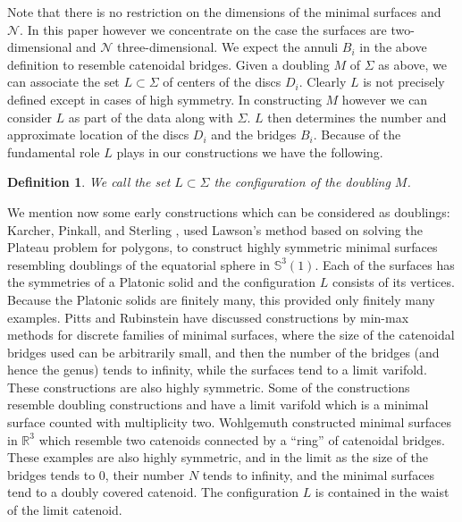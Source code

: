 \documentclass[12pt,namelimits,sumlimits]{amsart}
\newtheorem{definition}[theorem]{Definition}
\theoremstyle{remark}
\numberwithin{equation}{section}
\begin{document}
Note that there is no restriction on the dimensions of the minimal surfaces and ${{\mathcal{N}}}$.
In this paper however we concentrate on the case the surfaces are two-dimensional and ${{\mathcal{N}}}$
three-dimensional.
We expect the annuli $B_i$ in the above definition to resemble catenoidal bridges.
Given a doubling $M$ of $\Sigma$ as above, we can associate the set $L\subset\Sigma$ of centers of the discs
$D_i$.
Clearly $L$ is not precisely defined except in cases of high symmetry.
In constructing $M$ however we can consider $L$ as part of the data along with $\Sigma$.
$L$ then determines the number and approximate location of the discs $D_i$ and the bridges $B_i$.
Because of the fundamental role $L$ plays in our constructions we have the following.

\addtocounter{equation}{1}
\begin{definition}
\label{Dconfig}
We call the set $L\subset\Sigma$ the configuration of the doubling $M$.
\end{definition}

We mention now some
early constructions which can be considered as doublings:
Karcher, Pinkall, and Sterling \cite{KPS},
used Lawson's method \cite{L2} based on solving the Plateau problem for polygons,
to construct highly symmetric minimal surfaces
resembling doublings of the equatorial sphere in ${\mathbb{S}}^3(1)$.
Each of the surfaces has the symmetries of a Platonic solid
and the configuration $L$ consists of its vertices.
Because the Platonic solids are finitely many,
this provided only finitely many examples.
Pitts and Rubinstein have discussed \cite{PRu}
constructions by min-max methods for discrete families of minimal surfaces,
where the size of the catenoidal bridges used can be arbitrarily small,
and then the number of the bridges (and hence the genus)
tends to infinity,
while the surfaces tend to a limit varifold.
These constructions are also highly symmetric.
Some of the constructions resemble doubling constructions and have a limit varifold which is a minimal
surface counted with multiplicity two.
Wohlgemuth \cite{wohlg}
constructed minimal surfaces in ${{{\mathbb{R}}^3}}$
which resemble two catenoids connected by a ``ring'' of catenoidal bridges.
These examples are also highly symmetric,
and in the limit as the size of the bridges tends to $0$, their number $N$
tends to infinity, and the minimal surfaces tend to a doubly covered catenoid.
The configuration $L$ is contained in the waist of the limit catenoid.
\end{document}

